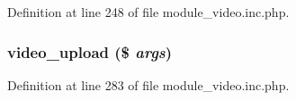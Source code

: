 Definition at line 248 of file module\_\-video.inc.php.

\hypertarget{module__video_8inc_8php_a6ab50ffd184d8dcf84a9783dd6a2f80e}{
\subsubsection[{video\_\-upload}]{\setlength{\rightskip}{0pt plus 5cm}video\_\-upload (\$ {\em args})}}
\label{module__video_8inc_8php_a6ab50ffd184d8dcf84a9783dd6a2f80e}


Definition at line 283 of file module\_\-video.inc.php.

